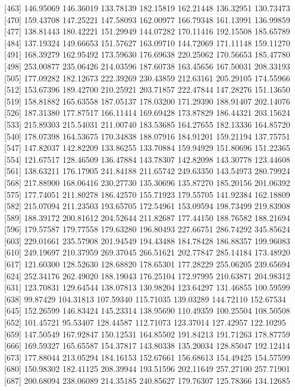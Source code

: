 \documentclass[
  10pt,
  a4paper,oneside]{article}
\begin{document}
{[}463{]} 146.95069 146.36019 133.78139 182.15819 162.21448 136.32951 130.73473
{[}470{]} 159.43708 147.25221 147.58093 162.00977 166.79348 161.13991 136.99859
{[}477{]} 138.81443 180.42221 151.29949 144.07282 170.11416 192.15508 185.65789
{[}484{]} 137.19324 149.66653 151.57627 163.09710 144.72069 171.11148 159.11270
{[}491{]} 168.39279 162.95492 173.59630 176.69638 220.25062 170.56653 185.47780
{[}498{]} 253.00877 235.06426 214.03596 187.60738 163.45656 167.50031 208.33193
{[}505{]} 177.09282 182.12673 222.39269 230.43859 212.63161 205.29105 174.55966
{[}512{]} 153.67396 189.42700 210.25921 203.71857 222.47844 147.28276 151.13650
{[}519{]} 158.81882 165.63558 187.05137 178.03200 171.29390 188.91407 202.14076
{[}526{]} 187.31380 177.87517 166.11414 169.69428 173.87829 186.44321 203.15624
{[}533{]} 215.89303 215.54031 211.00740 183.53685 164.27655 182.13336 164.85720
{[}540{]} 178.07398 164.53675 170.34838 188.07916 184.91201 159.21194 137.75751
{[}547{]} 147.82037 142.82209 133.86255 133.70884 159.94929 151.80696 151.22365
{[}554{]} 121.67517 128.46509 136.47884 143.78307 142.82098 143.30778 123.44608
{[}561{]} 138.63211 176.17905 241.84188 211.65742 249.63350 143.54973 280.79924
{[}568{]} 217.88900 168.06416 230.27730 135.30696 135.87270 185.20156 201.06392
{[}575{]} 177.74051 211.80278 186.42570 155.71923 179.55705 141.92384 162.18809
{[}582{]} 215.07094 211.23503 193.65705 172.54961 153.09594 198.73499 219.83908
{[}589{]} 188.39172 200.81612 204.52644 211.82687 177.44150 188.76582 188.21694
{[}596{]} 179.57587 179.77558 179.63280 196.80493 227.66751 286.74292 345.85624
{[}603{]} 229.01661 235.57908 201.94549 194.43488 184.78428 186.88357 199.96083
{[}610{]} 249.19697 210.37959 269.37045 266.51621 202.77847 285.14184 173.48920
{[}617{]} 121.60300 128.52630 128.68820 178.65301 177.28229 255.06205 239.65694
{[}624{]} 252.34176 262.49020 188.19043 176.25104 172.97995 210.63871 204.98312
{[}631{]} 123.70831 129.64544 138.07813 130.98204 123.64297 131.46855 100.59599
{[}638{]} 99.87429 104.31813 107.59340 115.71035 139.03289 144.72110 152.67534
{[}645{]} 152.26599 146.83424 145.23314 138.95690 110.49359 100.25504 108.50508
{[}652{]} 101.45721 95.53407 128.44587 112.71073 123.37014 127.42957 122.10295
{[}659{]} 147.50549 167.92847 150.12531 164.85502 191.84213 191.71263 178.87759
{[}666{]} 169.59327 165.65587 154.37817 143.80338 135.20034 128.85047 192.12414
{[}673{]} 177.88044 213.05294 184.16153 152.67661 156.68613 154.49425 154.57599
{[}680{]} 150.98302 182.41125 208.39944 193.51596 202.11649 257.27100 257.71901
{[}687{]} 200.68094 238.06089 214.35185 240.85627 179.76307 125.78366 134.12685
\end{document}
